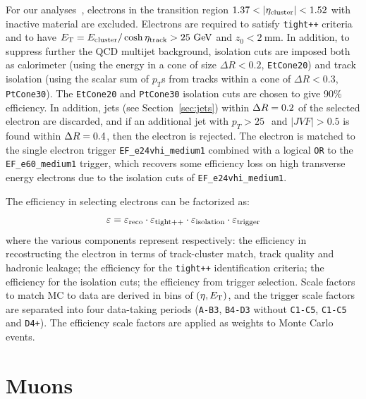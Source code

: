 For our analyses~\cite{topcommon2013}, electrons in the transition region $1.37<|\eta_{\rm cluster}| <1.52$
with inactive material are excluded. Electrons are required to satisfy \texttt{tight++} criteria and to
 have $\et = E_{\rm cluster}/\cosh\eta_{\rm track} > 25\gev$ and $z_0<2~$mm.
In addition, to suppress further the QCD multijet background, 
isolation cuts are imposed both as calorimeter (using the energy in a cone of size $\Delta R<0.2$, \texttt{EtCone20})
and track isolation (using the scalar sum of $p_T$s from tracks within a cone of $\Delta R<0.3$, \texttt{PtCone30}). 
The \texttt{EtCone20} and \texttt{PtCone30} isolation cuts are chosen to give
90\% efficiency.
In addition, jets (see Section~\ref{sec:jets}) within $\dr =0.2$ of the selected electron are 
discarded, and if an additional jet with $p_T>25~$\gev\  and $|JVF|>0.5$ is found within $\dr =0.4$,
then the electron is rejected.
The electron is matched to the single electron trigger \texttt{EF\_e24vhi\_medium1}
combined with a logical \texttt{OR} to the \texttt{EF\_e60\_medium1} trigger, which
recovers some efficiency loss on high transverse energy electrons due
to the isolation cuts of \texttt{EF\_e24vhi\_medium1}. %

The efficiency in selecting electrons can be factorized as:
\begin{equation}\label{eq:eleeff}
\varepsilon = \varepsilon_{\rm reco} \cdot\varepsilon_{\rm tight++} \cdot\varepsilon_{\rm isolation} \cdot\varepsilon_{\rm trigger} 
	\end{equation}
where the various components represent respectively: the efficiency in recostructing the electron 
in terms of track-cluster match, track quality and hadronic leakage; the efficiency
for the \texttt{tight++} identification criteria; the efficiency for the isolation cuts;
the efficiency from trigger selection. Scale factors to match MC to data
are derived in bins of $(\eta, \ET)$,
and the trigger scale factors are separated into four data-taking periods 
(\texttt{A-B3}, \texttt{B4-D3} without \texttt{C1-C5}, \texttt{C1-C5} and \texttt{D4+}).
The efficiency scale factors are applied as weights to Monte Carlo events.

\section{Muons}\label{sec:muons}

